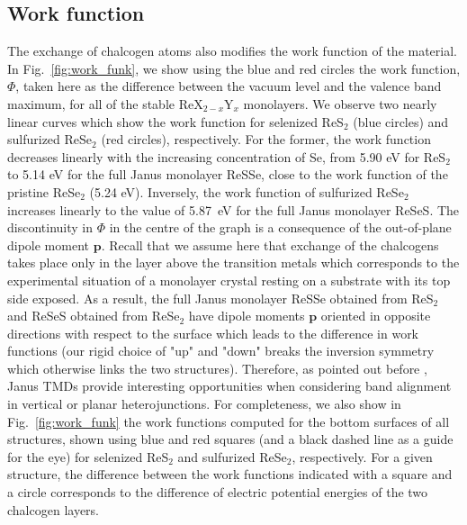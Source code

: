 \documentclass[reprint, superscriptaddress, amsmath,amssymb,prb,twocolumn]{revtex4-2}
\newcounter{bla}
\newcommand{\vect}[1]{\boldsymbol{#1}}	%
\begin{document}
\subsection{Work function}

The exchange of chalcogen atoms also modifies the work function of the material. In Fig.~\ref{fig:work_funk}, we show using the blue and red circles the work function, $\Phi$, taken here as the difference between the vacuum level and the valence band maximum, for all of the stable ReX$_{2-x}$Y$_{x}$ monolayers. We observe two nearly linear curves which show the work function for selenized ReS$_{2}$ (blue circles) and sulfurized ReSe$_{2}$ (red circles), respectively. For the former, the work function decreases linearly with the increasing concentration of Se, from 5.90 eV for ReS$_{2}$ to 5.14 eV for the full Janus monolayer ReSSe, close to the work function of the pristine ReSe$_2$ (5.24 eV). Inversely, the work function of sulfurized ReSe$_{2}$ increases linearly to the value of 5.87~eV for the full Janus monolayer ReSeS. The discontinuity in $\Phi$ in the centre of the graph is a consequence of the out-of-plane dipole moment $\vect{p}$. Recall that we assume here that exchange of the chalcogens takes place only in the layer above the transition metals which corresponds to the experimental situation of a monolayer crystal resting on a substrate with its top side exposed. As a result, the full Janus monolayer ReSSe obtained from ReS$_{2}$ and ReSeS obtained from ReSe$_{2}$ have dipole moments $\vect{p}$ oriented in opposite directions with respect to the surface which leads to the difference in work functions (our rigid choice of "up" and "down" breaks the inversion symmetry which otherwise links the two structures). Therefore, as pointed out before \cite{riis-jensen_jpcc_2018}, Janus TMDs provide interesting opportunities when considering band alignment in vertical or planar heterojunctions. For completeness, we also show in Fig.~\ref{fig:work_funk} the work functions computed for the bottom surfaces of all structures, shown using blue and red squares (and a black dashed line as a guide for the eye) for selenized ReS$_{2}$ and sulfurized ReSe$_{2}$, respectively. For a given structure, the difference between the work functions indicated with a square and a circle corresponds to the difference of electric potential energies of the two chalcogen layers.
\end{document}
